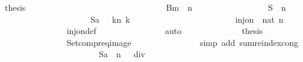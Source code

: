 \begin{isabellebody}
\ {\isacharquery}thesis\isanewline
\ \ \ \ \ \ \ \ \ \ \isacommand{{\isachardot}}\isamarkupfalse%
\isanewline
\ \ \ \ \ \ \isamarkupfalse%
\isanewline
\isanewline
\ \ \ \ \ \ \isamarkupfalse%
\isanewline
\isanewline
\ \ \ \ \ \ \isamarkupfalse%
\ {\isachardoublequoteopen}{\isasymSum}\ {\isacharquery}Bm\ {\isacharequal}\ {}{\isacharcircum}n{\isachardoublequoteclose}\isanewline
\ \ \ \ \ \ \isamarkupfalse%
{\isacharminus}\isanewline
\ \ \ \ \ \ \ \ \isamarkupfalse%
\ {\isachardoublequoteopen}{\isasymSum}\ {\isacharquery}S\ {\isacharequal}\ {}{\isacharasterisk}{}{\isacharcircum}n{\isachardoublequoteclose}\isanewline
\ \ \ \ \ \ \ \ \isamarkupfalse%
{\isacharminus}\isanewline
\ \ \ \ \ \ \ \ \ \ \isamarkupfalse%
\ {\isachardoublequoteopen}{\isasymSum}\ {\isacharquery}Sa\ {\isacharequal}\ {\isacharparenleft}{\isasymSum}\ k{\isasymin}{\isacharbraceleft}{}{\isachardot}{\isachardot}{\isacharless}n{\isacharbraceright}{\isachardot}\ {}{\isacharcircum}k{\isacharparenright}{\isachardoublequoteclose}\isanewline
\ \ \ \ \ \ \ \ \ \ \isamarkupfalse%
{\isacharminus}\isanewline
\ \ \ \ \ \ \ \ \ \ \ \ \isamarkupfalse%
\ {\isachardoublequoteopen}inj{\isacharunderscore}on\ {\isacharparenleft}{\isacharparenleft}{\isacharcircum}{\isacharparenright}\ {\isacharparenleft}{}{\isacharcolon}{\isacharcolon}nat{\isacharparenright}{\isacharparenright}\ {\isacharbraceleft}{}{\isachardot}{\isachardot}{\isacharless}n{\isacharbraceright}{\isachardoublequoteclose}\isanewline
\ \ \ \ \ \ \ \ \ \ \ \ \ \ \isamarkupfalse%
\ inj{\isacharunderscore}on{\isacharunderscore}def\isanewline
\ \ \ \ \ \ \ \ \ \ \ \ \ \ \isamarkupfalse%
\ auto\isanewline
\ \ \ \ \ \ \ \ \ \ \ \ \isamarkupfalse%
\ {\isacharquery}thesis\isanewline
\ \ \ \ \ \ \ \ \ \ \ \ \ \ \isamarkupfalse%
\ Setcompr{\isacharunderscore}eq{\isacharunderscore}image\isanewline
\ \ \ \ \ \ \ \ \ \ \ \ \ \ \isamarkupfalse%
\ {\isacharparenleft}simp\ add{\isacharcolon}\ sum{\isachardot}reindex{\isacharunderscore}cong{\isacharparenright}\isanewline
\ \ \ \ \ \ \ \ \ \ \isamarkupfalse%
\isanewline
\isanewline
\ \ \ \ \ \ \ \ \ \ \isamarkupfalse%
\ {\isachardoublequoteopen}{\isasymSum}\ {\isacharquery}Sa\ {\isacharequal}\ {\isacharparenleft}{}{\isacharcircum}n\ {\isacharminus}\ {}{\isacharparenright}\ div\ {}\ {\isacharminus}\ {}{\isachardoublequoteclose}\isanewline

\end{isabellebody}

